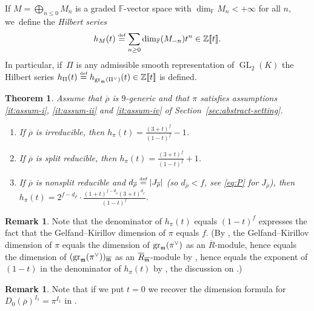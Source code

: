 \documentclass[JEP,XML,SOM,Unicode,NoFloatCountersInSection, NoEqCountersInSection,published]{cedram}
\let\ovl\overline
\newcommand{\defeq}{\stackrel{\textrm{\tiny{\upshape{def}}}}{=}}
\newcommand{\F}{\mathbb{F}}
\newcommand{\Z}{{\mathbb Z}}
\newcommand{\brho}{\overline{\rho}}
\newcommand{\bbra}[1]{[\mkern-3mu[#1]\mkern-3mu]}
\DeclareMathOperator{\GL}{GL}
\DeclareMathOperator{\gr}{gr}
\theoremstyle{plain}
\newtheorem{thm1}[prop1]{Theorem}
\theoremstyle{definition}
\newtheorem{rem1}[prop1]{Remark}
\begin{document}
If $M=\bigoplus_{n\leq 0} M_n$ is a graded $\F$-vector space {with $\dim_{\F}M_n<+\infty$ for all $n$}, we~define the \emph{Hilbert series}
\[
h_M(t)\defeq \sum_{n\geq 0} \dim_{\F}(M_{-n})t^n\in \Z\bbra{t}.
\]
{In particular, if~$\Pi$ is any admissible smooth representation of $\GL_2(K)$ the Hilbert series $h_\Pi(t) \defeq h_{\gr_\m(\Pi^\vee)}(t) \in \Z\bbra t$ is defined.}

\begin{thm1}\label{thm:Hilbert}
Assume that $\brho$ is $9$-generic and that $\pi$ satisfies assumptions \eqref{it:assum-i}, \eqref{it:assum-ii} and \eqref{it:assum-iv} of Section~\ref{sec:abstract-setting}.

\begin{enumerate}
\item\label{thm:Hilberti} If $\brho$ is irreducible, then $\displaystyle h_{{\pi}}(t)=\frac{(3+t)^f}{(1-t)^f}-1$.
\item\label{thm:Hilbertii} If $\brho$ is split reducible, then $\displaystyle h_{{\pi}}(t)=\frac{(3+t)^f}{(1-t)^f}+1$.
\item\label{thm:Hilbertiii} If $\brho$ is nonsplit reducible and $d_{\brho}\defeq |J_{\brho}|$ (so $d_{\brho} < f$, see \eqref{eq:P} for $J_{\brho}$), then $\displaystyle h_{{\pi}}(t)=2^{f-d_{\brho}}\cdot \frac{(1+t)^{f-d_{\brho}}(3+t)^{d_{\brho}}}{(1-t)^f}$.
\end{enumerate}
\end{thm1}

\begin{rem1}
{Note that the denominator of $h_\pi(t)$ equals $(1-t)^f$ expresses the fact that the Gelfand--Kirillov dimension of $\pi$ equals $f$.
(By \cite[Lem.\,5.1.3]{BHHMS1}, the Gelfand--Kirillov dimension of $\pi$ equals the dimension of $\gr_\m(\pi^\vee)$ as an $\ovl R$-module, hence equals the dimension of $(\gr_\m(\pi^\vee))_{\ovl\m}$ as an $\ovl R_{\ovl\m}$-module by \cite[Ex.\,1.5.25]{BH93}, hence equals the exponent of $(1-t)$ in the denominator of $h_\pi(t)$ by \cite[Th.\,13.2, 13.4]{Ma}, \cf the discussion on \cite[p.\,97]{Ma}.)}
\end{rem1}

\begin{rem1}\label{rem:Hilbert-pi}
Note that if we put $t = 0$ we recover the dimension formula for $D_0(\brho)^{I_1} = \pi^{I_1}$ in \cite[Th.\,1.1]{BP}.
\end{rem1}
\end{document}
